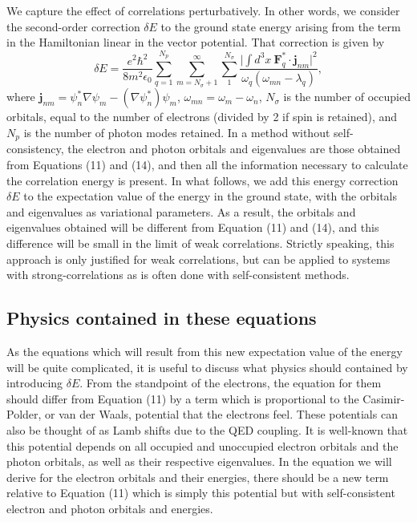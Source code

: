 \documentclass[aps,prb,onecolumn,preprint,
	groupedaddress,superscriptaddress,
	amsfonts,amssymb,amsmath,floatfix,
	citeautoscript]{revtex4-1}
\begin{document}
We capture the effect of correlations perturbatively. In other words, we consider the second-order correction $\delta E$ to the ground state energy arising from the term in the Hamiltonian linear in the vector potential. That correction is given by
\begin{equation}
\delta E = \frac{e^2\hbar^2}{8m^2\epsilon_0}\sum\limits_{q=1}^{N_p}\sum_{m=N_{\sigma}+1}^{\infty}\sum\limits_{1}^{N_{\sigma}} \frac{\Big| \int d^3x~\mathbf{F}_q^*\cdot\mathbf{j}_{nm}\Big|^2}{\omega_q(\omega_{mn} -\lambda_q)},
\end{equation}
where $\mathbf{j}_{nm} = \psi^*_n\nabla\psi_m - (\nabla\psi^*_n)\psi_m$, $\omega_{mn} = \omega_m - \omega_n$, $N_{\sigma}$ is the number of occupied orbitals, equal to the number of electrons (divided by 2 if spin is retained), and $N_p$ is the number of photon modes retained.  In a method without self-consistency, the electron and photon orbitals and eigenvalues are those obtained from Equations (11) and (14), and then all the information necessary to calculate the correlation energy is present. In what follows, we add this energy correction $\delta E$ to the expectation value of the energy in the ground state, with the orbitals and eigenvalues as variational parameters. As a result, the orbitals and eigenvalues obtained will be different from Equation (11) and (14), and this difference will be small in the limit of weak correlations. Strictly speaking, this approach is only justified for weak correlations, but can be applied to systems with strong-correlations as is often done with self-consistent methods. 

\subsection{Physics contained in these equations}

As the equations which will result from this new expectation value of the energy will be quite complicated, it is useful to discuss what physics should contained by introducing $\delta E$. From the standpoint of the electrons, the equation for them should differ from Equation (11) by a term which is proportional to the Casimir-Polder, or van der Waals, potential that the electrons feel.  These potentials can also be thought of as Lamb shifts due to the QED coupling. It is well-known that this potential depends on all occupied and unoccupied electron orbitals and the photon orbitals, as well as their respective eigenvalues. In the equation we will derive for the electron orbitals and their energies, there should be a new term relative to Equation (11) which is simply this potential but with self-consistent electron and photon orbitals and energies.
\end{document}
